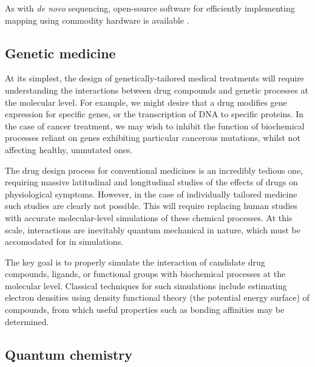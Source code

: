 As with \textit{de novo} sequencing, open-source software for efficiently implementing mapping using commodity hardware is available \cite{Bfast etc}.

%
%

\subsection{Genetic medicine}

At its simplest, the design of genetically-tailored medical treatments will require understanding the interactions between drug compounds and genetic processes at the molecular level. For example, we might desire that a drug modifies gene expression for specific genes, or the transcription of DNA to specific proteins. In the case of cancer treatment, we may wish to inhibit the function of biochemical processes reliant on genes exhibiting particular cancerous mutations, whilst not affecting healthy, unmutated ones.

The drug design process for conventional medicines is an incredibly tedious one, requiring massive latitudinal and longitudinal studies of the effects of drugs on physiological symptoms. However, in the case of individually tailored medicine such studies are clearly not possible. This will require replacing human studies with accurate molecular-level simulations of these chemical processes. At this scale, interactions are inevitably quantum mechanical in nature, which must be accomodated for in simulations.

The key goal is to properly simulate the interaction of candidate drug compounds, ligands, or functional groups with biochemical processes at the molecular level. Classical techniques for such simulations include estimating electron densities using density functional theory (the potential energy surface) of compounds, from which useful properties such as bonding affinities may be determined.

%
%

\subsection{Quantum chemistry}

